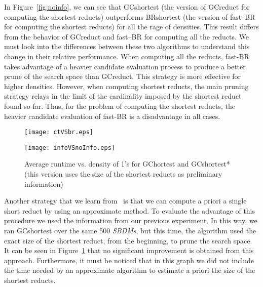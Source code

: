 \documentclass[authoryear,11pt]{elsarticle}
\begin{document}
  In Figure~\ref{fig:noinfo}, we can see that GCshortest (the version of GCreduct for computing the shortest reducts) outperforms BRshortest (the version of fast--BR for computing the shortest reducts) for all the rage of densities. This result differs from the behavior of GCreduct and fast--BR for computing all the reducts. We must look into the differences between these two algorithms to understand this change in their relative performance. When computing all the reducts, fast-BR takes advantage of a heavier candidate evaluation process to produce a better prune of the search space than GCreduct. This strategy is more effective for higher densities. However, when computing shortest reducts, the main pruning strategy relays in the limit of the cardinality imposed by the shortest reduct found so far. Thus, for the problem of computing the shortest reducts, the heavier candidate evaluation of fast-BR is a disadvantage in all cases.
  
  \begin{figure}[htb]
	  \begin{minipage}{.48\linewidth}  	
	  	\begin{center}
	  		\texttt{[image: ctVSbr.eps]}
	  	\end{center}
	  	\caption{Average runtime vs. density of 1's for GCshortest and BRshortest.\bigskip}
	  	\label{fig:noinfo}
	  \end{minipage}
	  \begin{minipage}{.48\linewidth}  
	  	\begin{center}
	  		\texttt{[image: infoVSnoInfo.eps]}
	  	\end{center}
	  	\caption{Average runtime vs. density of 1's for GChortest and GCshortest* (this version uses the size of the shortest reducts as preliminary information)}
	  	\label{fig:info}
	  \end{minipage}
  \end{figure}  

 Another strategy that we learn from~\cite{Lin04} is that we can compute a priori a single short reduct by using an approximate method. To evaluate the advantage of this procedure we used the information from our previous experiment. In this way, we ran GCshortest over the same 500 \textit{SBDMs}, but this time, the algorithm used the exact size of the shortest reduct, from the beginning, to prune the search space. It can be seen in Figure~\ref{fig:info} that no significant improvement is obtained from this approach. Furthermore, it must be noticed that in this graph we did not include the time needed by an approximate algorithm to estimate a priori the size of the shortest reducts.
 
\end{document}
